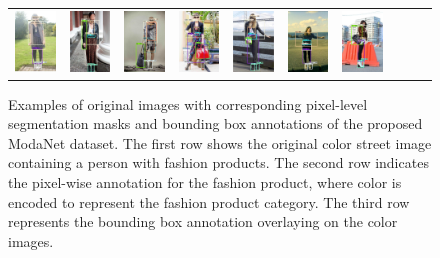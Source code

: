 \begin{figure}[H]
\begin{tabular}{cccccccccc}
		\includegraphics[width=.1\textwidth]{./figures/dataset/0020171_0_5_gt_b.jpg} &
		\includegraphics[width=.1\textwidth]{./figures/dataset/0020348_0_5_gt_b.jpg} & 
		\includegraphics[width=.1\textwidth]{./figures/dataset/0020830_0_5_gt_b.jpg} &
		\includegraphics[width=.1\textwidth]{./figures/dataset/0020879_0_5_gt_b.jpg} &
		\includegraphics[width=.1\textwidth]{./figures/dataset/0020910_0_5_gt_b.jpg} &
		\includegraphics[width=.1\textwidth]{./figures/dataset/0021450_0_5_gt_b.jpg} &
		\includegraphics[width=.1\textwidth]{./figures/dataset/0022212_0_5_gt_b.jpg}\\
		
	\end{tabular}
	\caption{Examples of original images with corresponding pixel-level segmentation masks and bounding box annotations of the proposed ModaNet dataset. The first row shows the original color street image containing a person with fashion products. The second row indicates the pixel-wise annotation for the fashion product, where color is encoded to represent the fashion product category. The third row represents the bounding box annotation overlaying on the color images.}
	\label{fig:annotations} %
\end{figure}



